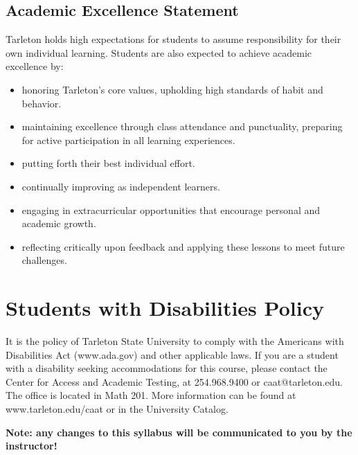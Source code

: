 \documentclass[10pt]{article}
\begin{document}
\subsection*{Academic Excellence Statement}
\label{sec:orgfa5d651}
Tarleton holds high expectations for students to assume responsibility for their own individual learning. Students are also expected to achieve academic excellence by:
\begin{itemize}
\item honoring Tarleton’s core values, upholding high standards of habit and behavior.
\item maintaining excellence through class attendance and punctuality, preparing for active participation in all learning experiences.
\item putting forth their best individual effort.
\item continually improving as independent learners.
\item engaging in extracurricular opportunities that encourage personal and academic growth.
\item reflecting critically upon feedback and applying these lessons to meet future challenges.
\end{itemize}

\section*{Students with Disabilities Policy}
\label{sec:org3b62964}

It is the policy of Tarleton State University to comply with the Americans with Disabilities  Act (www.ada.gov) and other applicable laws.  If you are a student with a disability seeking accommodations for this course, please contact the Center for Access and Academic Testing, at 254.968.9400 or caat@tarleton.edu. The office is located in Math 201. More information can be found at www.tarleton.edu/caat or in the University Catalog.​

\textbf{Note:  any changes to this syllabus will be communicated to you by the instructor!}

\newpage
\end{document}
